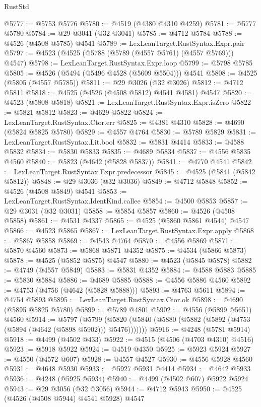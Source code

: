 \begin{lexlean}{RustStd}
\begin{coremodule}
{\begin{coremodule}
{{{{{{{{{{{{{{{{{{{{{{{{{{{{{{{{{{{{{{{{{{{{{{{{{{{{{{{@5777 := @5753 @5776
@5780 := @4519 (@4380 @4310 @4259)
@5781 := @5777 @5780
@5784 := @29 @3041 (@32 @3041)
@5785 := @4712 @5784
@5788 := @4526 (@4508 @5785) @4541
@5789 := LexLeanTarget.RustSyntax.Expr.pair
@5797 := @4523 (@4525 (@5788 (@5789 (@4557 @5761) (@4557 @5769))) @4547)
@5798 := LexLeanTarget.RustSyntax.Expr.loop
@5799 := @5798 @5785
@5805 := @4526 (@5494 (@5496 @4528 (@5609 @5504))) @4541
@5808 := @4525 (@5805 (@4557 @5785))
@5811 := @29 @3026 (@32 @3026)
@5812 := @4712 @5811
@5818 := @4525 (@4526 (@4508 @5812) @4541 @4581) @4547
@5820 := @4523 (@5808 @5818)
@5821 := LexLeanTarget.RustSyntax.Expr.isZero
@5822 := @5821 @5812
@5823 := @4629 @5822
@5824 := LexLeanTarget.RustSyntax.Ctor.err
@5825 := @4381 @4310
@5828 := @4690 (@5824 @5825 @5780)
@5829 := @4557 @4764
@5830 := @5789 @5829
@5831 := LexLeanTarget.RustSyntax.Lit.bool
@5832 := @5831 @4414
@5833 := @4588 @5832
@5834 := @5830 @5833
@5835 := @4689 @5834
@5837 := @4556 @5835 @4560
@5840 := @5823 (@4642 (@5828 @5837))
@5841 := @4770 @4541
@5842 := LexLeanTarget.RustSyntax.Expr.predecessor
@5845 := @4525 (@5841 (@5842 @5812))
@5848 := @29 @3036 (@32 @3036)
@5849 := @4712 @5848
@5852 := @4526 (@4508 @5849) @4541
@5853 := LexLeanTarget.RustSyntax.IdentKind.callee
@5854 := @4500 @5853
@5857 := @29 @3031 (@32 @3031)
@5858 := @5854 @5857
@5860 := @4526 (@4508 @5858)
@5861 := @4531 @4337
@5865 := @4525 (@5860 @5861 @4544) @4547
@5866 := @4523 @5865
@5867 := LexLeanTarget.RustSyntax.Expr.apply
@5868 := @5867 @5858
@5869 := @4543 @4764
@5870 := @4556 @5869
@5871 := @5870 @4560
@5873 := @5868 @5871 @4352
@5875 := @4534 (@5866 @5873)
@5878 := @4525 (@5852 @5875) @4547
@5880 := @4523 (@5845 @5878)
@5882 := @4749 (@4557 @5849)
@5883 := @5831 @4352
@5884 := @4588 @5883
@5885 := @5830 @5884
@5886 := @4689 @5885
@5888 := @4556 @5886 @4560
@5892 := @4753 (@4756 (@4642 (@5828 @5888)))
@5893 := @4763 @5611
@5894 := @4754 @5893
@5895 := LexLeanTarget.RustSyntax.Ctor.ok
@5898 := @4690 (@5895 @5825 @5780)
@5899 := @5789 @4801
@5902 := @4556 (@5899 @5651) @4560
@5914 := @5797
    (@5799 (@5820 (@5840 (@5880 (@5882 (@5892 (@4753 (@5894 (@4642 (@5898 @5902))) @5476)))))))
@5916 := @4248 (@5781 @5914)
@5918 := @4499 (@4502 @433)
@5922 := @4515 (@4506 (@4703 @4310) @4516)
@5923 := @5918 @5922
@5924 := @4519 @4350
@5925 := @5923 @5924
@5927 := @4550 (@4572 @607)
@5928 := @4557 @4527
@5930 := @4556 @5928 @4560
@5931 := @4648 @5930
@5933 := @5927 @5931 @4414
@5934 := @4642 @5933
@5936 := @4248 (@5925 @5934)
@5940 := @4499 (@4502 @607) @5922 @5924
@5943 := @29 @3056 (@32 @3056)
@5944 := @4712 @5943
@5950 := @4525 (@4526 (@4508 @5944) @4541 @5928) @4547
}}}}}}}}}}}}}}}}}}}}}}}}}}}}}}}}}}}}}}}}}}}}}}}}}}}}}}}
\end{coremodule}}
\end{coremodule}
\end{lexlean}
